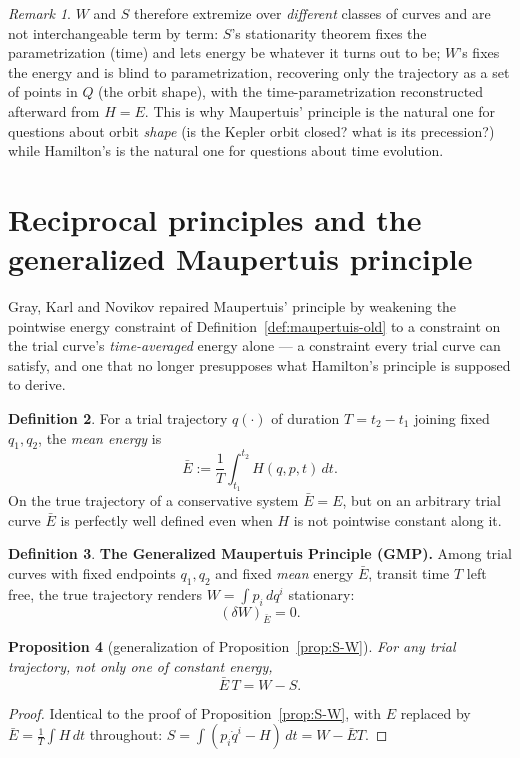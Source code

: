 \documentclass[11pt]{book}
\theoremstyle{definition}
\newtheorem{definition}{Definition}[section]
\theoremstyle{plain}
\newtheorem{proposition}[definition]{Proposition}
\theoremstyle{remark}
\newtheorem{remark}[definition]{Remark}
\begin{document}
\begin{remark}
$W$ and $S$ therefore extremize over \emph{different} classes of curves and are not interchangeable term by term: $S$'s stationarity theorem fixes the parametrization (time) and lets energy be whatever it turns out to be; $W$'s fixes the energy and is blind to parametrization, recovering only the trajectory as a set of points in $Q$ (the orbit shape), with the time-parametrization reconstructed afterward from $H=E$. This is why Maupertuis' principle is the natural one for questions about orbit \emph{shape} (is the Kepler orbit closed? what is its precession?) while Hamilton's is the natural one for questions about time evolution.
\end{remark}

\section{Reciprocal principles and the generalized Maupertuis principle}
\label{sec:reciprocal}

Gray, Karl and Novikov repaired Maupertuis' principle by weakening the pointwise energy constraint of Definition~\ref{def:maupertuis-old} to a constraint on the trial curve's \emph{time-averaged} energy alone --- a constraint every trial curve can satisfy, and one that no longer presupposes what Hamilton's principle is supposed to derive.

\begin{definition}
For a trial trajectory $q(\cdot)$ of duration $T=t_2-t_1$ joining fixed $q_1,q_2$, the \emph{mean energy} is
\[
\bar E := \frac1T\int_{t_1}^{t_2} H(q,p,t)\,dt .
\]
On the true trajectory of a conservative system $\bar E=E$, but on an arbitrary trial curve $\bar E$ is perfectly well defined even when $H$ is not pointwise constant along it.
\end{definition}

\begin{definition}
\textbf{The Generalized Maupertuis Principle (GMP).} Among trial curves with fixed endpoints $q_1,q_2$ and fixed \emph{mean} energy $\bar E$, transit time $T$ left free, the true trajectory renders $W=\int p_i\,dq^i$ stationary:
\[
(\delta W)_{\bar E} = 0 .
\]
\end{definition}

\begin{proposition}[generalization of Proposition~\ref{prop:S-W}]
For \emph{any} trial trajectory, not only one of constant energy,
\[
\bar E\,T = W - S .
\]
\end{proposition}
\begin{proof}
Identical to the proof of Proposition~\ref{prop:S-W}, with $E$ replaced by $\bar E=\frac1T\int H\,dt$ throughout: $S=\int(p_i\dot q^i - H)\,dt = W - \bar E T$.
\end{proof}
\end{document}
